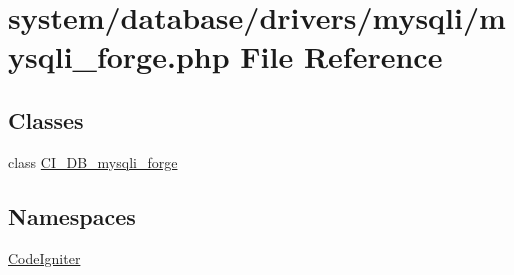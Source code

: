\hypertarget{mysqli__forge_8php}{}\section{system/database/drivers/mysqli/mysqli\+\_\+forge.php File Reference}
\label{mysqli__forge_8php}
\subsection*{Classes}
\begin{DoxyCompactItemize}
\item 
class \mbox{\hyperlink{class_c_i___d_b__mysqli__forge}{C\+I\+\_\+\+D\+B\+\_\+mysqli\+\_\+forge}}
\end{DoxyCompactItemize}
\subsection*{Namespaces}
\begin{DoxyCompactItemize}
\item 
 \mbox{\hyperlink{namespace_code_igniter}{Code\+Igniter}}
\end{DoxyCompactItemize}
